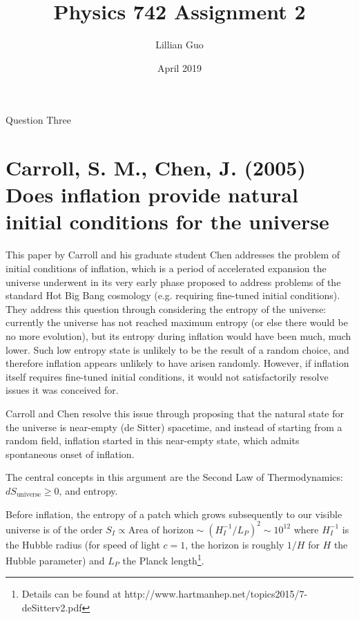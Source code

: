 \documentclass[12pt]{article}
\title{Physics 742 Assignment 2}
\author{Lillian Guo}
\date{April 2019}
\begin{document}
\maketitle
Question Three
\section*{Carroll, S. M., Chen, J. (2005) Does inflation provide natural initial conditions for the universe}

This paper by Carroll and his graduate student Chen \cite{Carroll2005} addresses the problem of initial conditions of inflation, which is a period of accelerated expansion the universe underwent in its very early phase proposed to address problems of the standard Hot Big Bang cosmology (e.g. requiring fine-tuned initial conditions). They address this question through considering the entropy of the universe: currently the universe has not reached maximum entropy (or else there would be no more evolution), but its entropy during inflation would have been much, much lower. Such low entropy state is unlikely to be the result of a random choice, and therefore inflation appears unlikely to have arisen randomly. However, if inflation itself requires fine-tuned initial conditions, it would not satisfactorily resolve issues it was conceived for.\par 

Carroll and Chen resolve this issue through proposing that the natural state for the universe is near-empty (de Sitter) spacetime, and instead of starting from a random field, inflation started in this near-empty state, which admits spontaneous onset of inflation. \par 

The central concepts in this argument are the Second Law of Thermodynamics: $dS_\mathrm{universe} \geq 0$, and entropy.\par 

Before inflation, the entropy of a patch which grows subsequently to our visible universe is of the order $S_I \propto \text{Area of horizon} \sim (H_I^{-1}/L_P)^2 \sim 10^{12}$ where $H_I^{-1}$ is the Hubble radius (for speed of light $c=1$, the horizon is roughly $1/H$ for $H$ the Hubble parameter) and $L_P$ the Planck length\footnote{Details can be found at http://www.hartmanhep.net/topics2015/7-deSitterv2.pdf}.\par 
\end{document}
